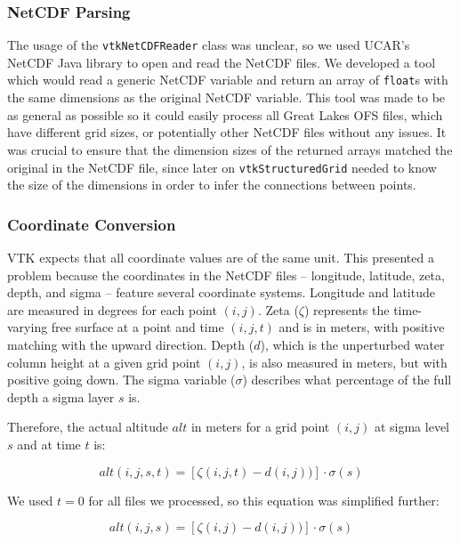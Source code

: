 \documentclass{article} %
\newcommand{\code}[1]{\texttt{#1}}
\begin{document}
\subsubsection{NetCDF Parsing}

The usage of the \code{vtkNetCDFReader} class was unclear, so we used UCAR's NetCDF Java library to open and read the NetCDF files.  We developed a tool which would read a generic NetCDF variable and return an array of \code{float}s with the same dimensions as the original NetCDF variable.  This tool was made to be as general as possible so it could easily process all Great Lakes OFS files, which have different grid sizes, or potentially other NetCDF files without any issues.  It was crucial to ensure that the dimension sizes of the returned arrays matched the original in the NetCDF file, since later on \code{vtkStructuredGrid} needed to know the size of the dimensions in order to infer the connections between points.

\subsubsection{Coordinate Conversion}
\label{sec:coord}

VTK expects that all coordinate values are of the same unit.  This presented a problem because the coordinates in the NetCDF files -- longitude, latitude, zeta, depth, and sigma -- feature several coordinate systems.  Longitude and latitude are measured in degrees for each point $(i, j)$.  Zeta ($\zeta$) represents the time-varying free surface at a point and time $(i, j, t)$ and is in meters, with positive matching with the upward direction.  Depth ($d$), which is the unperturbed water column height at a given grid point $(i, j)$, is also measured in meters, but with positive going down.  The sigma variable ($\sigma$) describes what percentage of the full depth a sigma layer $s$ is.

Therefore, the actual altitude $alt$ in meters for a grid point $(i, j)$ at sigma level $s$ and at time $t$ is:

\begin{equation}\label{eq:depth}
alt(i, j, s, t) = [\zeta(i, j, t) - d(i, j))] \cdot \sigma(s)
\end{equation}

We used $t = 0$ for all files we processed, so this equation was simplified further:

\begin{equation}
alt(i, j, s) = [\zeta(i, j) - d(i, j))] \cdot \sigma(s)
\end{equation}
\end{document}
